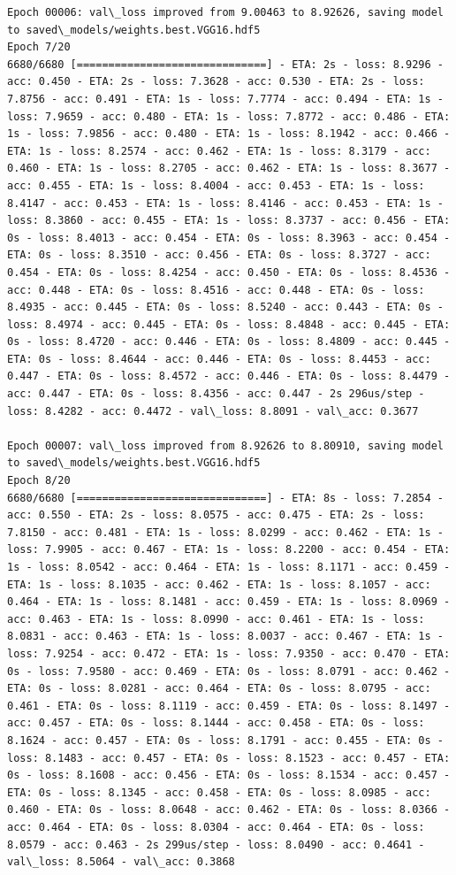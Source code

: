 \documentclass[11pt]{article}
\begin{document}
\begin{Verbatim}[commandchars=\\\{\}]
Epoch 00006: val\_loss improved from 9.00463 to 8.92626, saving model to saved\_models/weights.best.VGG16.hdf5
Epoch 7/20
6680/6680 [==============================] - ETA: 2s - loss: 8.9296 - acc: 0.450 - ETA: 2s - loss: 7.3628 - acc: 0.530 - ETA: 2s - loss: 7.8756 - acc: 0.491 - ETA: 1s - loss: 7.7774 - acc: 0.494 - ETA: 1s - loss: 7.9659 - acc: 0.480 - ETA: 1s - loss: 7.8772 - acc: 0.486 - ETA: 1s - loss: 7.9856 - acc: 0.480 - ETA: 1s - loss: 8.1942 - acc: 0.466 - ETA: 1s - loss: 8.2574 - acc: 0.462 - ETA: 1s - loss: 8.3179 - acc: 0.460 - ETA: 1s - loss: 8.2705 - acc: 0.462 - ETA: 1s - loss: 8.3677 - acc: 0.455 - ETA: 1s - loss: 8.4004 - acc: 0.453 - ETA: 1s - loss: 8.4147 - acc: 0.453 - ETA: 1s - loss: 8.4146 - acc: 0.453 - ETA: 1s - loss: 8.3860 - acc: 0.455 - ETA: 1s - loss: 8.3737 - acc: 0.456 - ETA: 0s - loss: 8.4013 - acc: 0.454 - ETA: 0s - loss: 8.3963 - acc: 0.454 - ETA: 0s - loss: 8.3510 - acc: 0.456 - ETA: 0s - loss: 8.3727 - acc: 0.454 - ETA: 0s - loss: 8.4254 - acc: 0.450 - ETA: 0s - loss: 8.4536 - acc: 0.448 - ETA: 0s - loss: 8.4516 - acc: 0.448 - ETA: 0s - loss: 8.4935 - acc: 0.445 - ETA: 0s - loss: 8.5240 - acc: 0.443 - ETA: 0s - loss: 8.4974 - acc: 0.445 - ETA: 0s - loss: 8.4848 - acc: 0.445 - ETA: 0s - loss: 8.4720 - acc: 0.446 - ETA: 0s - loss: 8.4809 - acc: 0.445 - ETA: 0s - loss: 8.4644 - acc: 0.446 - ETA: 0s - loss: 8.4453 - acc: 0.447 - ETA: 0s - loss: 8.4572 - acc: 0.446 - ETA: 0s - loss: 8.4479 - acc: 0.447 - ETA: 0s - loss: 8.4356 - acc: 0.447 - 2s 296us/step - loss: 8.4282 - acc: 0.4472 - val\_loss: 8.8091 - val\_acc: 0.3677

Epoch 00007: val\_loss improved from 8.92626 to 8.80910, saving model to saved\_models/weights.best.VGG16.hdf5
Epoch 8/20
6680/6680 [==============================] - ETA: 8s - loss: 7.2854 - acc: 0.550 - ETA: 2s - loss: 8.0575 - acc: 0.475 - ETA: 2s - loss: 7.8150 - acc: 0.481 - ETA: 1s - loss: 8.0299 - acc: 0.462 - ETA: 1s - loss: 7.9905 - acc: 0.467 - ETA: 1s - loss: 8.2200 - acc: 0.454 - ETA: 1s - loss: 8.0542 - acc: 0.464 - ETA: 1s - loss: 8.1171 - acc: 0.459 - ETA: 1s - loss: 8.1035 - acc: 0.462 - ETA: 1s - loss: 8.1057 - acc: 0.464 - ETA: 1s - loss: 8.1481 - acc: 0.459 - ETA: 1s - loss: 8.0969 - acc: 0.463 - ETA: 1s - loss: 8.0990 - acc: 0.461 - ETA: 1s - loss: 8.0831 - acc: 0.463 - ETA: 1s - loss: 8.0037 - acc: 0.467 - ETA: 1s - loss: 7.9254 - acc: 0.472 - ETA: 1s - loss: 7.9350 - acc: 0.470 - ETA: 0s - loss: 7.9580 - acc: 0.469 - ETA: 0s - loss: 8.0791 - acc: 0.462 - ETA: 0s - loss: 8.0281 - acc: 0.464 - ETA: 0s - loss: 8.0795 - acc: 0.461 - ETA: 0s - loss: 8.1119 - acc: 0.459 - ETA: 0s - loss: 8.1497 - acc: 0.457 - ETA: 0s - loss: 8.1444 - acc: 0.458 - ETA: 0s - loss: 8.1624 - acc: 0.457 - ETA: 0s - loss: 8.1791 - acc: 0.455 - ETA: 0s - loss: 8.1483 - acc: 0.457 - ETA: 0s - loss: 8.1523 - acc: 0.457 - ETA: 0s - loss: 8.1608 - acc: 0.456 - ETA: 0s - loss: 8.1534 - acc: 0.457 - ETA: 0s - loss: 8.1345 - acc: 0.458 - ETA: 0s - loss: 8.0985 - acc: 0.460 - ETA: 0s - loss: 8.0648 - acc: 0.462 - ETA: 0s - loss: 8.0366 - acc: 0.464 - ETA: 0s - loss: 8.0304 - acc: 0.464 - ETA: 0s - loss: 8.0579 - acc: 0.463 - 2s 299us/step - loss: 8.0490 - acc: 0.4641 - val\_loss: 8.5064 - val\_acc: 0.3868


\end{Verbatim}
\end{document}

